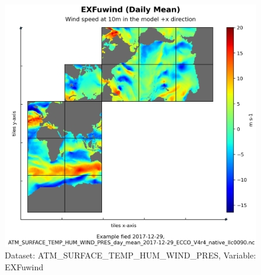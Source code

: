\begin{figure}[H]
\centering
\includegraphics[scale=0.55]{../images/plots/native_plots/Atmosphere_Surface_Temperature_Humidity_Wind_and_Pressure/EXFuwind.png}
\caption{Dataset: ATM\_SURFACE\_TEMP\_HUM\_WIND\_PRES, Variable: EXFuwind}
\label{tab:table-ATM_SURFACE_TEMP_HUM_WIND_PRES_EXFuwind-Plot}
\end{figure}
\pagebreak
